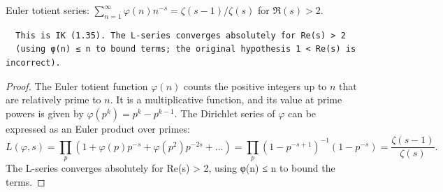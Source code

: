 \begin{theorem}
\label{LSeries_totient_eq}
\leanok
Euler totient series: $\sum_{n=1}^{\infty} \varphi(n) n^{-s} = \zeta(s-1)/\zeta(s)$ for $\Re(s) > 2$.
  \begin{verbatim}
  This is IK (1.35). The L-series converges absolutely for Re(s) > 2
  (using φ(n) ≤ n to bound terms; the original hypothesis 1 < Re(s) is incorrect).
  \end{verbatim}
\end{theorem}
\begin{proof}
\leanok
The Euler totient function $\varphi(n)$ counts the positive integers up to $n$ that are relatively prime to $n$. It is a multiplicative function, and its value at prime powers is given by $\varphi(p^k) = p^k - p^{k-1}$. The Dirichlet series of $\varphi$ can be expressed as an Euler product over primes:
\[
L(\varphi, s) = \prod_{p} \left(1 + \varphi(p)p^{-s} + \varphi(p^2)p^{-2s} + \ldots\right) = \prod_{p} \left(1 - p^{-s  +1}\right)^{-1} \left(1 - p^{-s}\right) = \frac{\zeta(s-1)}{\zeta(s)}.
\]
  The L-series converges absolutely for Re(s) > 2, using φ(n) ≤ n to bound the terms.
\end{proof}
